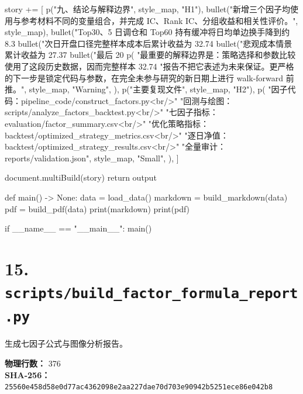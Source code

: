 \documentclass[UTF8,a4paper,fontset=fandol]{ctexart}
\begin{document}
\begin{ProjectCode}
    story += [
        p("九、结论与解释边界", style_map, "H1"),
        bullet("新增三个因子均使用与参考材料不同的变量组合，并完成 IC、Rank IC、分组收益和相关性评价。", style_map),
        bullet("Top30、5 日调仓和 Top60 持有缓冲将日均单边换手降到约 8.3%
        bullet("次日开盘口径完整样本成本后累计收益为 32.74%
        bullet("悲观成本情景累计收益为 27.37%
        bullet("最后 20%
        p(
            "最重要的解释边界是：策略选择和参数比较使用了这段历史数据，因而完整样本 32.74%
            "报告不把它表述为未来保证。更严格的下一步是锁定代码与参数，在完全未参与研究的新日期上进行 walk-forward 前推。",
            style_map,
            "Warning",
        ),
        p("主要复现文件", style_map, "H2"),
        p(
            "因子代码：pipeline_code/construct_factors.py<br/>"
            "回测与绘图：scripts/analyze_factors_backtest.py<br/>"
            "七因子指标：evaluation/factor_summary.csv<br/>"
            "优化策略指标：backtest/optimized_strategy_metrics.csv<br/>"
            "逐日净值：backtest/optimized_strategy_results.csv<br/>"
            "全量审计：reports/validation.json",
            style_map,
            "Small",
        ),
    ]

    document.multiBuild(story)
    return output


def main() -> None:
    data = load_data()
    markdown = build_markdown(data)
    pdf = build_pdf(data)
    print(markdown)
    print(pdf)


if __name__ == "__main__":
    main()
\end{ProjectCode}
\clearpage
\section{15. \texttt{scripts/build\_factor\_formula\_report.py}}
生成七因子公式与图像分析报告。

\textbf{物理行数：} 376\\
\textbf{SHA-256：} \texttt{25560e458d58e0d77ac4362098e2aa227dae70d703e90942b5251ece86e042b8}
\end{document}
